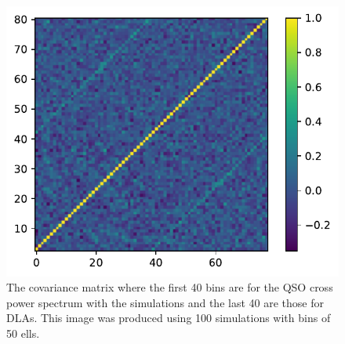 \documentclass{amsart}
\begin{document}
\begin{figure}
  \includegraphics[width=\linewidth]{covariance.pdf}
  \caption{The covariance matrix where the first 40 bins are for the QSO cross power spectrum with the simulations and the last 40 are those for DLAs. This image was produced using 100 simulations with bins of 50 ells.}
  \label{fig:convariance}
\end{figure}
\end{document}
